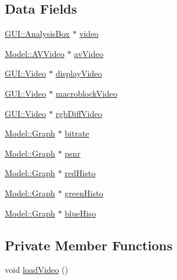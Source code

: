\subsection*{Data Fields}
\begin{DoxyCompactItemize}
\item 
\hyperlink{classGUI_1_1AnalysisBox}{G\+U\+I\+::\+Analysis\+Box} $\ast$ \hyperlink{classModel_1_1EncodedVideo_a03e0f42a43f7a856dd9881df4024fb4c}{video}
\item 
\hyperlink{classModel_1_1AVVideo}{Model\+::\+A\+V\+Video} $\ast$ \hyperlink{classModel_1_1EncodedVideo_a270efc836b2d2c70aec72106128ff89f}{av\+Video}
\item 
\hyperlink{classGUI_1_1Video}{G\+U\+I\+::\+Video} $\ast$ \hyperlink{classModel_1_1EncodedVideo_af8206df3707fca9fd439fd3ed73b6156}{display\+Video}
\item 
\hyperlink{classGUI_1_1Video}{G\+U\+I\+::\+Video} $\ast$ \hyperlink{classModel_1_1EncodedVideo_ac019308d6d192c24889c93228b2b2437}{macroblock\+Video}
\item 
\hyperlink{classGUI_1_1Video}{G\+U\+I\+::\+Video} $\ast$ \hyperlink{classModel_1_1EncodedVideo_a100339bd02ee160a9cd848016e84adc7}{rgb\+Diff\+Video}
\item 
\hyperlink{classModel_1_1Graph}{Model\+::\+Graph} $\ast$ \hyperlink{classModel_1_1EncodedVideo_aec2e020f785ceb00064fb8033826603e}{bitrate}
\item 
\hyperlink{classModel_1_1Graph}{Model\+::\+Graph} $\ast$ \hyperlink{classModel_1_1EncodedVideo_a9bac82e3934ef7816be95e35cd18c852}{psnr}
\item 
\hyperlink{classModel_1_1Graph}{Model\+::\+Graph} $\ast$ \hyperlink{classModel_1_1EncodedVideo_a687c8a2518054613e946c48f33520458}{red\+Histo}
\item 
\hyperlink{classModel_1_1Graph}{Model\+::\+Graph} $\ast$ \hyperlink{classModel_1_1EncodedVideo_af09ff3f1ad12186cc33f3ab4cb146cdb}{green\+Histo}
\item 
\hyperlink{classModel_1_1Graph}{Model\+::\+Graph} $\ast$ \hyperlink{classModel_1_1EncodedVideo_a53ce36c444026a777d53d7c2d872b059}{blue\+Hiso}
\end{DoxyCompactItemize}
\subsection*{Private Member Functions}
\begin{DoxyCompactItemize}
\item 
void \hyperlink{classModel_1_1EncodedVideo_a220f0cb424996d91cbe098b02c484bb0}{load\+Video} ()
\end{DoxyCompactItemize}
